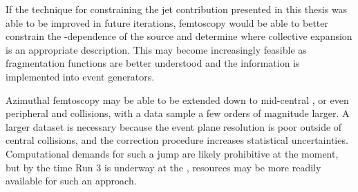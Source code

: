 If the technique for constraining the jet contribution presented in this thesis was able to be improved in future iterations, femtoscopy would be able to better constrain the \kt-dependence of the source and determine where collective expansion is an appropriate description.
This may become increasingly feasible as fragmentation functions are better understood and the information is implemented into \mc event generators.

Azimuthal femtoscopy may be able to be extended down to mid-central \pPb, or even peripheral \pPb and \pp collisions, with a data sample a few orders of magnitude larger.
A larger dataset is necessary because the event plane resolution is poor outside of central \pPb collisions, and the correction procedure increases statistical uncertainties.
Computational demands for such a jump are likely prohibitive at the moment, but by the time Run 3 is underway at the \lhc, resources may be more readily available for such an approach.

